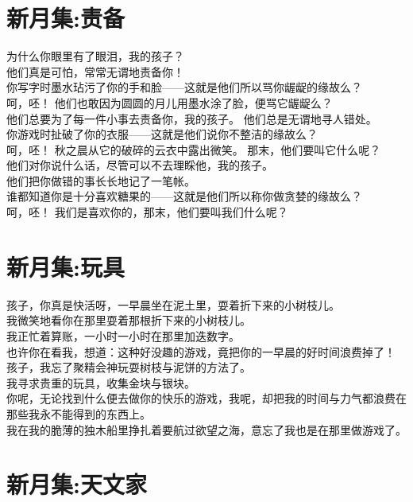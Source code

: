 \documentclass[]{book}
\renewenvironment{quote}{\begin{VF}}{\end{VF}}
\begin{document}
\section{新月集:责备}

\begin{quote}
为什么你眼里有了眼泪，我的孩子？\\
他们真是可怕，常常无谓地责备你！\\
你写字时墨水玷污了你的手和脸------这就是他们所以骂你龌龊的缘故么？\\
呵，呸！ 他们也敢因为圆圆的月儿用墨水涂了脸，便骂它龌龊么？\\
他们总要为了每一件小事去责备你，我的孩子。 他们总是无谓地寻人错处。\\
你游戏时扯破了你的衣服------这就是他们说你不整洁的缘故么？\\
呵，呸！ 秋之晨从它的破碎的云衣中露出微笑。 那末，他们要叫它什么呢？\\
他们对你说什么话，尽管可以不去理睬他，我的孩子。\\
他们把你做错的事长长地记了一笔帐。\\
谁都知道你是十分喜欢糖果的------这就是他们所以称你做贪婪的缘故么？\\
呵，呸！ 我们是喜欢你的，那末，他们要叫我们什么呢？
\end{quote}

\section{新月集:玩具}

\begin{quote}
孩子，你真是快活呀，一早晨坐在泥土里，耍着折下来的小树枝儿。\\
我微笑地看你在那里耍着那根折下来的小树枝儿。\\
我正忙着算账，一小时一小时在那里加迭数字。\\
也许你在看我，想道：这种好没趣的游戏，竟把你的一早晨的好时间浪费掉了！\\
孩子，我忘了聚精会神玩耍树枝与泥饼的方法了。\\
我寻求贵重的玩具，收集金块与银块。\\
你呢，无论找到什么便去做你的快乐的游戏，我呢，却把我的时间与力气都浪费在那些我永不能得到的东西上。\\
我在我的脆薄的独木船里挣扎着要航过欲望之海，意忘了我也是在那里做游戏了。
\end{quote}

\section{新月集:天文家}
\end{document}
